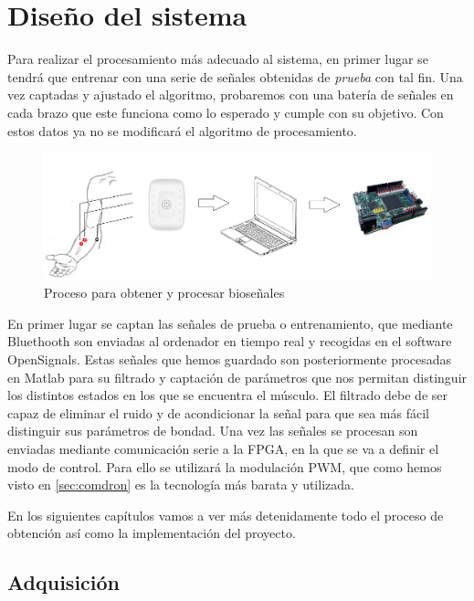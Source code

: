  \chapter{Diseño del sistema} 

Para realizar el procesamiento más adecuado al sistema, en primer lugar se tendrá que entrenar con una serie de señales obtenidas de \textit{prueba} con tal fin. Una vez captadas y ajustado el algoritmo, probaremos con una batería de señales en cada brazo que este funciona como lo esperado y cumple con su objetivo. Con estos datos ya no se modificará el algoritmo de procesamiento. 

\begin{figure}[H]
	\center
	\includegraphics[scale=0.6]{imagenes/Disenodelsistema/sistema.png}
	\caption{Proceso para obtener y procesar bioseñales}
	\label{fig:Sistema}
\end{figure}


En primer lugar se captan las señales de prueba o entrenamiento, que mediante Bluethooth son enviadas al ordenador en tiempo real y recogidas en el software OpenSignals. Estas señales que hemos guardado son posteriormente procesadas en Matlab para su filtrado y captación de parámetros que nos permitan distinguir los distintos estados en los que se encuentra el músculo. El filtrado debe de ser capaz de eliminar el ruido y de acondicionar la señal para que sea más fácil distinguir sus parámetros de bondad. 
 \newline
Una vez las señales se procesan son enviadas mediante comunicación serie a la FPGA, en la que se va a definir el modo de control. Para ello se utilizará la modulación PWM, que como hemos visto en \ref{sec:comdron} es la tecnología más barata y utilizada. 

En los siguientes capítulos vamos a ver más detenidamente todo el proceso de obtención así como la implementación del proyecto.

\section{Adquisición}

